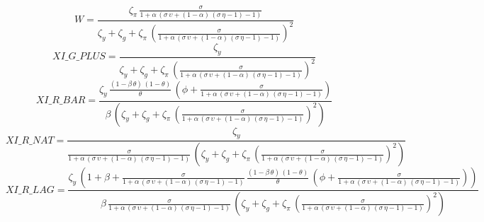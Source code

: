\begin{dmath*}
W = \frac{{\zeta_{\pi}}\, \frac{{\sigma}}{1+{\alpha}\, \left({\sigma}\, {\upsilon}+\left(1-{\alpha}\right)\, \left({\sigma}\, {\eta}-1\right)-1\right)}}{{\zeta_{y}}+{\zeta_{g}}+{\zeta_{\pi}}\, \left(\frac{{\sigma}}{1+{\alpha}\, \left({\sigma}\, {\upsilon}+\left(1-{\alpha}\right)\, \left({\sigma}\, {\eta}-1\right)-1\right)}\right)^{2}}
\end{dmath*}
\begin{dmath*}
XI\_G\_PLUS = \frac{{\zeta_{y}}}{{\zeta_{y}}+{\zeta_{g}}+{\zeta_{\pi}}\, \left(\frac{{\sigma}}{1+{\alpha}\, \left({\sigma}\, {\upsilon}+\left(1-{\alpha}\right)\, \left({\sigma}\, {\eta}-1\right)-1\right)}\right)^{2}}
\end{dmath*}
\begin{dmath*}
XI\_R\_BAR = \frac{{\zeta_{y}}\, \frac{\left(1-{\beta}\, {\theta}\right)\, \left(1-{\theta}\right)}{{\theta}}\, \left({\phi}+\frac{{\sigma}}{1+{\alpha}\, \left({\sigma}\, {\upsilon}+\left(1-{\alpha}\right)\, \left({\sigma}\, {\eta}-1\right)-1\right)}\right)}{{\beta}\, \left({\zeta_{y}}+{\zeta_{g}}+{\zeta_{\pi}}\, \left(\frac{{\sigma}}{1+{\alpha}\, \left({\sigma}\, {\upsilon}+\left(1-{\alpha}\right)\, \left({\sigma}\, {\eta}-1\right)-1\right)}\right)^{2}\right)}
\end{dmath*}
\begin{dmath*}
XI\_R\_NAT = \frac{{\zeta_{y}}}{\frac{{\sigma}}{1+{\alpha}\, \left({\sigma}\, {\upsilon}+\left(1-{\alpha}\right)\, \left({\sigma}\, {\eta}-1\right)-1\right)}\, \left({\zeta_{y}}+{\zeta_{g}}+{\zeta_{\pi}}\, \left(\frac{{\sigma}}{1+{\alpha}\, \left({\sigma}\, {\upsilon}+\left(1-{\alpha}\right)\, \left({\sigma}\, {\eta}-1\right)-1\right)}\right)^{2}\right)}
\end{dmath*}
\begin{dmath*}
XI\_R\_LAG = \frac{{\zeta_{y}}\, \left(1+{\beta}+\frac{{\sigma}}{1+{\alpha}\, \left({\sigma}\, {\upsilon}+\left(1-{\alpha}\right)\, \left({\sigma}\, {\eta}-1\right)-1\right)}\, \frac{\left(1-{\beta}\, {\theta}\right)\, \left(1-{\theta}\right)}{{\theta}}\, \left({\phi}+\frac{{\sigma}}{1+{\alpha}\, \left({\sigma}\, {\upsilon}+\left(1-{\alpha}\right)\, \left({\sigma}\, {\eta}-1\right)-1\right)}\right)\right)}{{\beta}\, \frac{{\sigma}}{1+{\alpha}\, \left({\sigma}\, {\upsilon}+\left(1-{\alpha}\right)\, \left({\sigma}\, {\eta}-1\right)-1\right)}\, \left({\zeta_{y}}+{\zeta_{g}}+{\zeta_{\pi}}\, \left(\frac{{\sigma}}{1+{\alpha}\, \left({\sigma}\, {\upsilon}+\left(1-{\alpha}\right)\, \left({\sigma}\, {\eta}-1\right)-1\right)}\right)^{2}\right)}
\end{dmath*}
